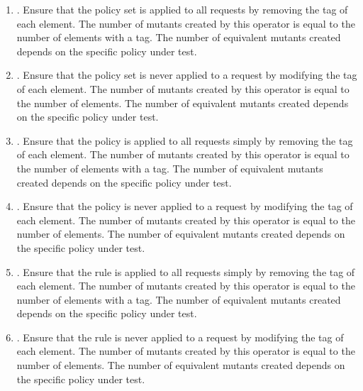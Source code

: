 {\begin{enumerate}

\item {}. Ensure that the
policy set is applied to all requests by removing the
 tag of each  element. The number
of mutants created by this operator is equal to the number of
 elements with a  tag. The number
of equivalent mutants created depends on the specific policy under
test.

\item {}. Ensure that the
policy set is never applied to a request by modifying the
 tag of each  element. The number
of mutants created by this operator is equal to the number of
 elements. The number of equivalent mutants
created depends on the specific policy under test.

\item {}. Ensure that the policy is
applied to all requests simply by removing the  tag
of each  element. The number of mutants created by
this operator is equal to the number of  elements
with a  tag. The number of equivalent mutants
created depends on the specific policy under test.

\item {}. Ensure that the policy is
never applied to a request by modifying the  tag of
each  element. The number of mutants created by this
operator is equal to the number of  elements. The
number of equivalent mutants created depends on the specific policy
under test.

\item {}. Ensure that the rule is
applied to all requests simply by removing the  tag
of each  element. The number of mutants created by this
operator is equal to the number of  elements with a
 tag. The number of equivalent mutants created
depends on the specific policy under test.

\item {}. Ensure that the rule is
never applied to a request by modifying the  tag of
each  element. The number of mutants created by this
operator is equal to the number of  elements. The
number of equivalent mutants created depends on the specific policy
under test.


\end{enumerate}}
